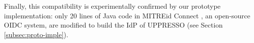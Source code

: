 Finally,
    this compatibility is experimentally confirmed by our prototype implementation:
     only 20 lines of Java code in MITREid Connect \cite{MITREid}, an open-source OIDC system,
 are modified
    to build the IdP of UPPRESSO (see Section \ref{subsec:proto-imple}).





